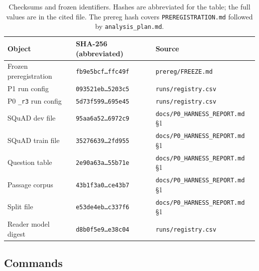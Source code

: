 \begin{table}[pos=htbp]
  \centering
  \caption{Checksums and frozen identifiers. Hashes are abbreviated for the table; the full
  values are in the cited file. The prereg hash covers \texttt{PREREGISTRATION.md} followed by
  \texttt{analysis\_plan.md}.}
  \label{tab:hashes}
  \small
  \begin{tabularx}{\textwidth}{>{\raggedright\arraybackslash}p{5.0cm}>{\raggedright\arraybackslash}p{4.6cm}>{\raggedright\arraybackslash}X}
    \toprule
    \textbf{Object} & \textbf{SHA-256 (abbreviated)} & \textbf{Source} \\
    \midrule
    Frozen preregistration & \texttt{fb9e5bcf\ldots ffc49f} & \texttt{prereg/FREEZE.md} \\
    P1 run config & \texttt{093521eb\ldots 5203c5} & \texttt{runs/registry.csv} \\
    P0 \texttt{\_r3} run config & \texttt{5d73f599\ldots 695e45} & \texttt{runs/registry.csv} \\
    SQuAD dev file & \texttt{95aa6a52\ldots 6972c9} & \texttt{docs/P0\_HARNESS\_REPORT.md} \S1 \\
    SQuAD train file & \texttt{35276639\ldots 2fd955} & \texttt{docs/P0\_HARNESS\_REPORT.md} \S1 \\
    Question table & \texttt{2e90a63a\ldots 55b71e} & \texttt{docs/P0\_HARNESS\_REPORT.md} \S1 \\
    Passage corpus & \texttt{43b1f3a0\ldots ce43b7} & \texttt{docs/P0\_HARNESS\_REPORT.md} \S1 \\
    Split file & \texttt{e53de4eb\ldots c337f6} & \texttt{docs/P0\_HARNESS\_REPORT.md} \S1 \\
    Reader model digest & \texttt{d8b0f5e9\ldots e38c04} & \texttt{runs/registry.csv} \\
    \bottomrule
  \end{tabularx}
\end{table}

\subsection{Commands}

